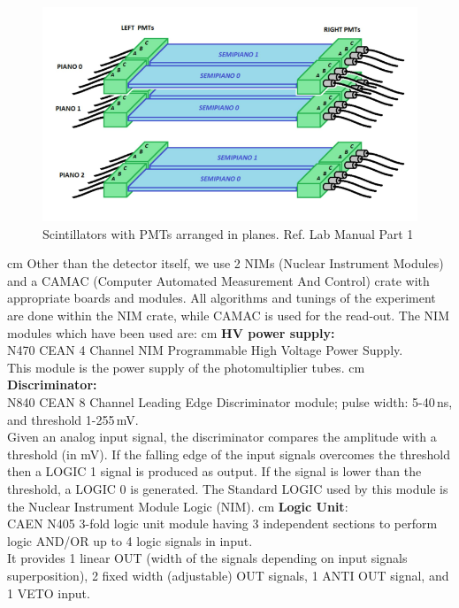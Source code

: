 	\begin{figure}
		\centering
		\includegraphics[width=1\textwidth]{figures/33.png}
		\caption{Scintillators with PMTs arranged in planes. Ref. Lab Manual Part 1}
		\label{fig:Setup}
	\end{figure}
	 cm
	Other than the detector itself, we use 2 NIMs (Nuclear Instrument Modules) and a 
    CAMAC (Computer Automated Measurement And Control) crate with appropriate boards and modules.
    All algorithms and tunings of the experiment are done within the NIM crate, while CAMAC is used
    for the read-out. The NIM modules which have been used are: 
	 cm
	\textbf{HV power supply:}\\ N470 CEAN 4 Channel NIM Programmable High Voltage
    Power Supply.\\
	This module is the power supply of the photomultiplier tubes.
	 cm
	\textbf{Discriminator:}\\ N840 CEAN 8 Channel Leading Edge Discriminator module; pulse width:
    5-40\,ns, and threshold 1-255\,mV.\\
	Given an analog input signal, the discriminator compares the amplitude with a threshold 
    (in mV). If the falling edge of the input signals overcomes the threshold
    then a LOGIC 1 signal is produced as output. If the signal is lower than the threshold,
    a LOGIC 0 is generated. The Standard LOGIC used by this module is the Nuclear Instrument
    Module Logic (NIM).
	 cm
	\textbf{Logic Unit}:\\ CAEN N405 3-fold logic unit module having 3 independent sections to
    perform logic AND/OR up to 4 logic signals in input.\\
	It provides 1 linear OUT (width of the signals depending on input signals superposition),
    2 ﬁxed width (adjustable) OUT signals, 1 ANTI OUT signal, and 1 VETO input.
